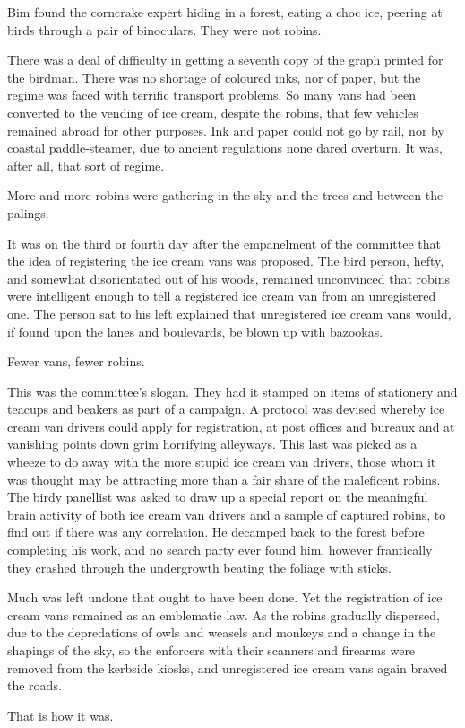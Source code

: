 Bim found the corncrake expert hiding in a forest, eating a choc ice, peering at birds through a pair of binoculars. They were not robins.

There was a deal of difficulty in getting a seventh copy of the graph printed for the birdman. There was no shortage of coloured inks, nor of paper, but the regime was faced with terrific transport problems. So many vans had been converted to the vending of ice cream, despite the robins, that few vehicles remained abroad for other purposes. Ink and paper could not go by rail, nor by coastal paddle-steamer, due to ancient regulations none dared overturn. It was, after all, that sort of regime.

More and more robins were gathering in the sky and the trees and between the palings.

It was on the third or fourth day after the empanelment of the committee that the idea of registering the ice cream vans was proposed. The bird person, hefty, and somewhat disorientated out of his woods, remained unconvinced that robins were intelligent enough to tell a registered ice cream van from an unregistered one. The person sat to his left explained that unregistered ice cream vans would, if found upon the lanes and boulevards, be blown up with bazookas.

Fewer vans, fewer robins.

This was the committee's slogan. They had it stamped on items of stationery and teacups and beakers as part of a campaign. A protocol was devised whereby ice cream van drivers could apply for registration, at post offices and bureaux and at vanishing points down grim horrifying alleyways. This last was picked as a wheeze to do away with the more stupid ice cream van drivers, those whom it was thought may be attracting more than a fair share of the maleficent robins. The birdy panellist was asked to draw up a special report on the meaningful brain activity of both ice cream van drivers and a sample of captured robins, to find out if there was any correlation. He decamped back to the forest before completing his work, and no search party ever found him, however frantically they crashed through the undergrowth beating the foliage with sticks.

Much was left undone that ought to have been done. Yet the registration of ice cream vans remained as an emblematic law. As the robins gradually dispersed, due to the depredations of owls and weasels and monkeys and a change in the shapings of the sky, so the enforcers with their scanners and firearms were removed from the kerbside kiosks, and unregistered ice cream vans again braved the roads.

That is how it was.